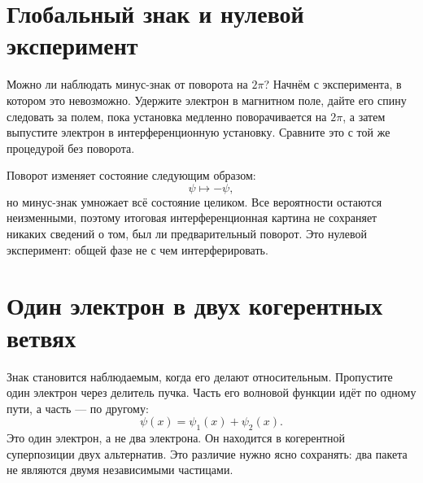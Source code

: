 \begin{classroomqa}
\end{classroomqa}

\section{Глобальный знак и нулевой эксперимент}

Можно ли наблюдать минус-знак от поворота на \(2\pi\)? Начнём с эксперимента, в котором это невозможно. Удержите электрон в магнитном поле, дайте его спину следовать за полем, пока установка медленно поворачивается на \(2\pi\), а затем выпустите электрон в интерференционную установку. Сравните это с той же процедурой без поворота.

Поворот изменяет состояние следующим образом:
\begin{equation}
\psi\longmapsto-\psi,
\end{equation}
но минус-знак умножает всё состояние целиком. Все вероятности остаются неизменными, поэтому итоговая интерференционная картина не сохраняет никаких сведений о том, был ли предварительный поворот. Это нулевой эксперимент: общей фазе не с чем интерферировать.

\begin{classroomqa}
\end{classroomqa}

\section{Один электрон в двух когерентных ветвях}

Знак становится наблюдаемым, когда его делают относительным. Пропустите один электрон через делитель пучка. Часть его волновой функции идёт по одному пути, а часть — по другому:
\begin{equation}
\psi(x)=\psi_1(x)+\psi_2(x).
\end{equation}
Это один электрон, а не два электрона. Он находится в когерентной суперпозиции двух альтернатив. Это различие нужно ясно сохранять: два пакета не являются двумя независимыми частицами.

